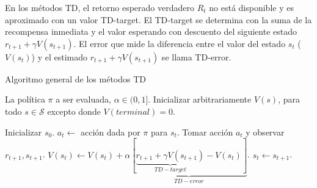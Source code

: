 En los métodos TD, el retorno esperado verdadero $R_t$ no está disponible
y es aproximado con un valor TD-target. El TD-target se determina con la suma de la recompensa inmediata y el valor esperando con descuento del 
siguiente estado $r_{t+1} + \gamma V(s_{t+1})$. El error que mide la diferencia entre el valor del estado $s_t$ ($V(s_t)$) y el estimado $r_{t+1} + \gamma V(s_{t+1})$ se llama TD-error.

\begin{mialgoritmo}[H]
  	\caption{Algoritmo general de los métodos TD}
	\label{alg:TD-algo}
  \begin{algorithmic}[1]
  \REQUIRE La política $\pi$ a ser evaluada, $\alpha \in (0,1]$.
  \STATE Inicializar arbitrariamente $V(s)$, para todo $s\in \mathcal{S}$ excepto donde $V(terminal) = 0$.
  
    \STATE Inicializar $s_0$.
    \STATE $a_{t} \leftarrow$ acción dada por $\pi$ para $s_t$.
    \STATE Tomar acción $a_t$ y observar $r_{t+1}, s_{t+1}$.
    \STATE $V(s_t) \leftarrow V(s_t) + \alpha\underbrace{[\underbrace{r_{t+1} + \gamma V(s_{t+1})}_{TD-target} - V(s_t)]}_{TD-error}$.
    \STATE $s_t \leftarrow s_{t+1}$.
    \ENDFOR
  \ENDFOR
  \end{algorithmic}
\end{mialgoritmo}



	
	
	
	

